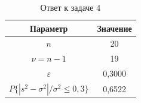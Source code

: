 \begin{table}[H]
\centering
\caption{Ответ к задаче 4}
\small
\begin{tabular}{cc}
\toprule
Параметр & Значение \\
\midrule
$n$ & 20 \\
$\nu = n-1$ & 19 \\
$\varepsilon$ & 0,3000 \\
$P\{|s^2-\sigma^2|/\sigma^2 \le 0{,}3\}$ & 0,6522 \\
\bottomrule
\end{tabular}
\end{table}
